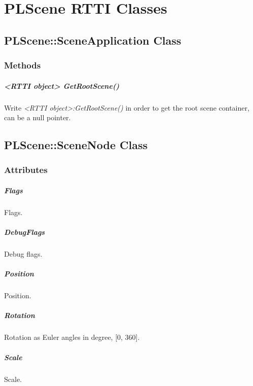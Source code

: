 \chapter{PLScene RTTI Classes}




\section{PLScene::SceneApplication Class}


\subsection{Methods}

\paragraph{<RTTI object> GetRootScene()}
Write \emph{<RTTI object>:GetRootScene()} in order to get the root scene container, can be a null pointer.




\section{PLScene::SceneNode Class}


\subsection{Attributes}

\paragraph{Flags}
Flags.

\paragraph{DebugFlags}
Debug flags.

\paragraph{Position}
Position.

\paragraph{Rotation}
Rotation as Euler angles in degree, [0, 360].

\paragraph{Scale}
Scale.


